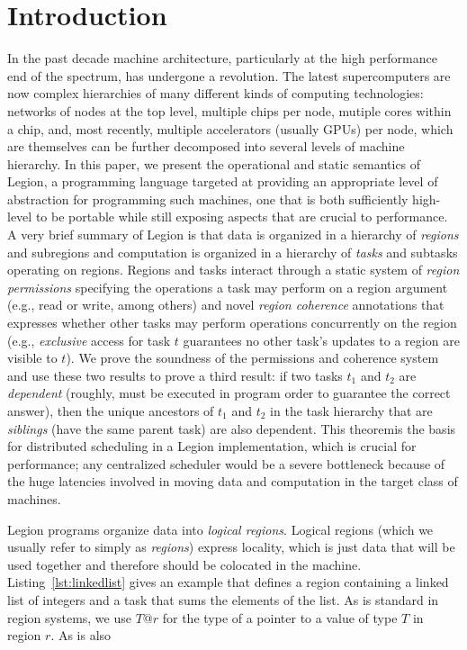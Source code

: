 
\section{Introduction}
\label{sec:intro}

In the past decade machine architecture, particularly at the high
performance end of the spectrum, has undergone a revolution.  The
latest supercomputers are now complex hierarchies of many different
kinds of computing technologies: networks of nodes at the top level,
multiple chips per node, mutiple cores within a chip, and, most
recently, multiple accelerators (usually GPUs) per node, which are
themselves can be further decomposed into several levels of machine
hierarchy.  In this paper, we present the operational and static
semantics of Legion, a programming language targeted at providing an
appropriate level of abstraction for programming such machines, one
that is both sufficiently high-level to be portable while still
exposing aspects that are crucial to performance. A very brief summary
of Legion is that data is organized in a hierarchy of {\em regions}
and subregions and computation is organized in a hierarchy of {\em
tasks} and subtasks operating on regions.  Regions and tasks interact
through a static system of {\em region permissions} specifying the
operations a task may perform on a region argument (e.g., read or
write, among others) and novel {\em region coherence} annotations that
expresses whether other tasks may perform operations concurrently on
the region (e.g., {\em exclusive} access for task $t$ guarantees no
other task's updates to a region are visible to $t$).  We prove the
soundness of the permissions and coherence system and use these two
results to prove a third result: if two tasks $t_1$ and $t_2$ are {\em
dependent} (roughly, must be executed in program order to guarantee
the correct answer), then the unique ancestors of $t_1$ and $t_2$ in
the task hierarchy that are {\em siblings} (have the same parent task)
are also dependent.  This theoremis the basis for distributed
scheduling in a Legion implementation, which is crucial for
performance; any centralized scheduler would be a severe bottleneck
because of the huge latencies involved in moving data and computation
in the target class of machines.

Legion programs organize data into {\em logical regions}.  Logical
regions (which we usually refer to simply as {\em regions}) express
locality, which is just data that will be used together and therefore
should be colocated in the machine.  Listing~\ref{lst:linkedlist}
gives an example that defines a region containing a linked list of integers and a task
that sums the elements of the list.  As is standard in region systems, we use
$T @ r$ for the type of a pointer to a value of type $T$ in region $r$.
As is also

